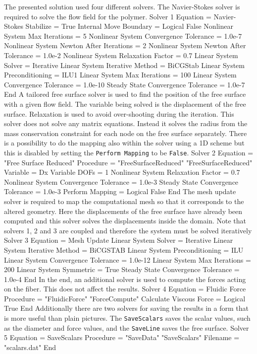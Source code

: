 The presented solution used four different solvers. 
The Navier-Stokes solver is required to solve the flow field
for the polymer.
\ttbegin
Solver 1
  Equation = Navier-Stokes
  Stabilize = True
  Internal Move Boundary = Logical False
  Nonlinear System Max Iterations = 5
  Nonlinear System Convergence Tolerance = 1.0e-7
  Nonlinear System Newton After Iterations = 2
  Nonlinear System Newton After Tolerance = 1.0e-2
  Nonlinear System Relaxation Factor = 0.7
  Linear System Solver = Iterative
  Linear System Iterative Method = BiCGStab 
  Linear System Preconditioning = ILU1
  Linear System Max Iterations = 100
  Linear System Convergence Tolerance = 1.0e-10
  Steady State Convergence Tolerance = 1.0e-7
End
\ttend
%
A tailored free surface solver is used to find the 
position of the free surface with a given flow field.
The variable being solved is the displacement of the free surface.
Relaxation is used to avoid over-shooting during the iteration.
This solver does not solve any matrix equations. Instead it solves
the radius from the mass conservation constraint for each node on the
free surface separately. There is a possibility to do the mapping also 
within the solver using a 1D scheme but this is disabled by setting
the \texttt{Perform Mapping} to be \texttt{False}.
\ttbegin
Solver 2
  Equation = "Free Surface Reduced"
  Procedure = "FreeSurfaceReduced" "FreeSurfaceReduced"
  Variable = Dx
  Variable DOFs = 1
  Nonlinear System Relaxation Factor = 0.7
  Nonlinear System Convergence Tolerance = 1.0e-3
  Steady State Convergence Tolerance = 1.0e-3
  Perform Mapping = Logical False
End
\ttend
%
The mesh update solver is required to map the computational mesh
so that it corresponds to the altered geometry.
Here the displacements of the free surface have already been computed
and this solver solves the displacements inside the domain.
Note that solvers 1, 2 and 3 are coupled and therefore the system must be solved iteratively
\ttbegin
Solver 3
  Equation = Mesh Update
  Linear System Solver = Iterative 
  Linear System Iterative Method = BiCGSTAB
  Linear System Preconditioning = ILU
  Linear System Convergence Tolerance = 1.0e-12
  Linear System Max Iterations = 200
  Linear System Symmetric = True
  Steady State Convergence Tolerance = 1.0e-4
End
\ttend
%
In the end, an additional solver is used to compute the forces
acting on the fiber. This does not affect the results.
\ttbegin
Solver 4 
  Equation = Fluidic Force
  Procedure = "FluidicForce" "ForceCompute"
  Calculate Viscous Force = Logical True
End
\ttend
%
Additionally there are two solvers for saving the results in a form
that is more useful than plain pictures. The \texttt{SaveScalars} saves
the scalar values, such as the diameter and force values,
and the \texttt{SaveLine} saves the free surface.
\ttbegin
Solver 5
  Equation = SaveScalars
  Procedure = "SaveData" "SaveScalars"
  Filename = "scalars.dat"
End 

